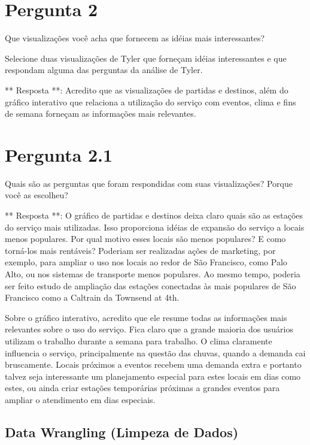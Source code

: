 \documentclass[11pt]{article}
\begin{document}
    \section{Pergunta 2}\label{pergunta-2}

Que visualizações você acha que fornecem as idéias mais interessantes?

Selecione duas visualizações de Tyler que forneçam idéias interessantes
e que respondam alguma das perguntas da análise de Tyler.

    ** Resposta **: Acredito que as visualizações de partidas e destinos,
além do gráfico interativo que relaciona a utilização do serviço com
eventos, clima e fins de semana forneçam as informações mais relevantes.

    \section{Pergunta 2.1}\label{pergunta-2.1}

Quais são as perguntas que foram respondidas com suas visualizações?
Porque você as escolheu?

    ** Resposta **: O gráfico de partidas e destinos deixa claro quais são
as estações do serviço mais utilizadas. Isso proporciona idéias de
expansão do serviço a locais menos populares. Por qual motivo esses
locais são menos populares? E como torná-los mais rentáveis? Poderiam
ser realizadas ações de marketing, por exemplo, para ampliar o uso nos
locais ao redor de São Francisco, como Palo Alto, ou nos sistemas de
transporte menos populares. Ao mesmo tempo, poderia ser feito estudo de
ampliação das estações conectadas às mais populares de São Francisco
como a Caltrain da Townsend at 4th.

Sobre o gráfico interativo, acredito que ele resume todas as informações
mais relevantes sobre o uso do serviço. Fica claro que a grande maioria
dos usuários utilizam o trabalho durante a semana para trabalho. O clima
claramente influencia o serviço, principalmente na questão das chuvas,
quando a demanda cai bruscamente. Locais próximos a eventos recebem uma
demanda extra e portanto talvez seja interessante um planejamento
especial para estes locais em dias como estes, ou ainda criar estações
temporárias próximas a grandes eventos para ampliar o atendimento em
dias especiais.

    \subsection{Data Wrangling (Limpeza de
Dados)}\label{data-wrangling-limpeza-de-dados}
\end{document}
